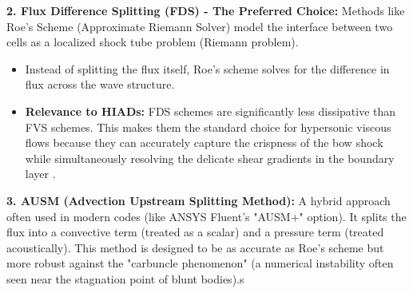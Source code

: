 \textbf{2. Flux Difference Splitting (FDS) - The Preferred Choice:}
Methods like Roe’s Scheme (Approximate Riemann Solver) model the interface between two cells as a localized shock tube problem (Riemann problem).
\begin{itemize}
    \item Instead of splitting the flux itself, Roe's scheme solves for the difference in flux across the wave structure.
    \item \textbf{Relevance to HIADs:} FDS schemes are significantly less dissipative than FVS schemes. This makes them the standard choice for hypersonic viscous flows because they can accurately capture the crispness of the bow shock while simultaneously resolving the delicate shear gradients in the boundary layer \cite{toro2009riemann}.
\end{itemize}

\textbf{3. AUSM (Advection Upstream Splitting Method):}
A hybrid approach often used in modern codes (like ANSYS Fluent's "AUSM+" option). It splits the flux into a convective term (treated as a scalar) and a pressure term (treated acoustically). This method is designed to be as accurate as Roe's scheme but more robust against the "carbuncle phenomenon" (a numerical instability often seen near the stagnation point of blunt bodies).s
